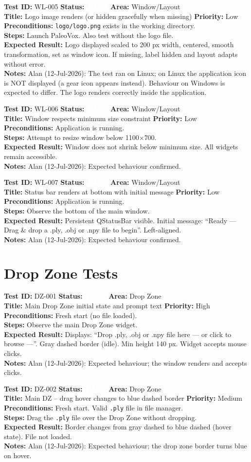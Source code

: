 \documentclass[12pt,a4paper]{article}
\newcommand{\statuspass}{\colorbox{statusgreen}{\textcolor{white}{\textbf{\,PASS\,}}}}
\newcommand{\testcase}[9]{%
  \smallskip
  \noindent\textbf{Test ID:} #1 \hfill \textbf{Status:} #2 \hfill \textbf{Area:} #3 \\
  \textbf{Title:} #4 \hfill \textbf{Priority:} #5 \\[0.3em]
  \textbf{Preconditions:} #6 \\[0.3em]
  \textbf{Steps:} #7 \\[0.3em]
  \textbf{Expected Result:} #8 \\
  \textbf{Notes:} #9
  \smallskip
}
\begin{document}
\testcase{WL-005}{\statuspass}{Window/Layout}{Logo image renders (or hidden gracefully when missing)}{Low}{\texttt{logo/logo.png} exists in the working directory.}{Launch PaleoVox. Also test without the logo file.}{Logo displayed scaled to 200 px width, centered, smooth transformation, set as window icon. If missing, label hidden and layout adapts without error.}{Alan (12-Jul-2026): The test ran on Linux; on Linux the application icon is NOT displayed (a gear icon appears instead). Behaviour on Windows is expected to differ. The logo renders correctly inside the application.}


\testcase{WL-006}{\statuspass}{Window/Layout}{Window respects minimum size constraint}{Low}{Application is running.}{Attempt to resize window below 1100$\times$700.}{Window does not shrink below minimum size. All widgets remain accessible.}{Alan (12-Jul-2026): Expected behaviour confirmed.}


\testcase{WL-007}{\statuspass}{Window/Layout}{Status bar renders at bottom with initial message}{Low}{Application is running.}{Observe the bottom of the main window.}{Persistent QStatusBar visible. Initial message: ``Ready --- Drag \& drop a .ply, .obj or .npy file to begin''. Left-aligned.}{Alan (12-Jul-2026): Expected behaviour confirmed.}



\section{Drop Zone Tests}

\testcase{DZ-001}{\statuspass}{Drop Zone}{Main Drop Zone initial state and prompt text}{High}{Fresh start (no file loaded).}{Observe the main Drop Zone widget.}{Displays: ``Drop .ply, .obj or .npy file here --- or click to browse ---''. Gray dashed border (idle). Min height 140 px. Widget accepts mouse clicks.}{Alan (12-Jul-2026): Expected behaviour; the window renders and accepts clicks.}


\testcase{DZ-002}{\statuspass}{Drop Zone}{Main DZ -- drag hover changes to blue dashed border}{Medium}{Fresh start. Valid \texttt{.ply} file in file manager.}{Drag the \texttt{.ply} file over the Drop Zone without dropping.}{Border changes from gray dashed to blue dashed (hover state). File not loaded.}{Alan (12-Jul-2026): Expected behaviour; the drop zone border turns blue on hover.}
\end{document}
